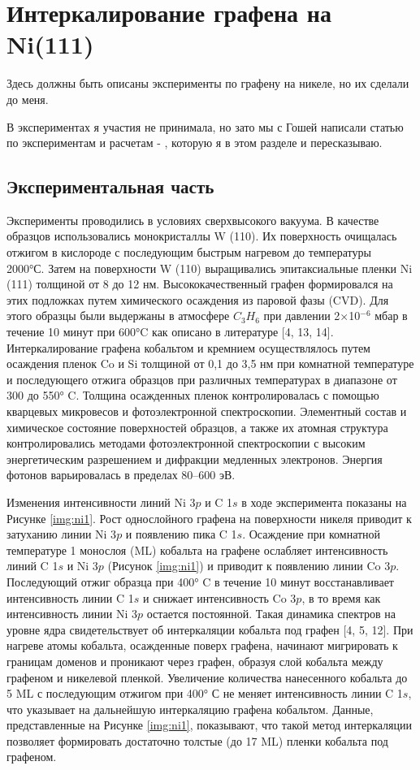 
\chapter{Интеркалирование графена на Ni(111)}\label{ch:ch1}
Здесь должны быть описаны эксперименты по графену на никеле, но их сделали до меня.

В экспериментах я участия не принимала, но зато мы с Гошей написали статью по экспериментам и расчетам - \cite{grebenyuk2019840}, которую я в этом разделе и пересказываю.
\section{Экспериментальная часть}\label{sec:ch1/sec1}


Эксперименты проводились в условиях сверхвысокого вакуума. В качестве образцов использовались монокристаллы W (110). Их поверхность очищалась отжигом в кислороде с последующим быстрым нагревом до температуры ~ 2000°С. Затем на поверхности W (110)  выращивались эпитаксиальные пленки Ni (111) толщиной от 8 до 12 нм. Высококачественный графен формировался на этих подложках путем химического осаждения из паровой фазы (CVD). Для этого образцы были выдержаны в атмосфере $C_3H_6$ при давлении 2×10$^{-6}$ мбар в течение 10 минут при 600°C как описано в литературе [4, 13, 14]. Интеркалирование графена кобальтом и кремнием осуществлялось путем осаждения пленок Co и Si толщиной от 0,1 до 3,5 нм при комнатной температуре и последующего отжига образцов при различных температурах в диапазоне от 300 до 550° C. Толщина осажденных пленок контролировалась с помощью кварцевых микровесов и фотоэлектронной спектроскопии. 
Элементный состав и химическое состояние поверхностей образцов, а также их атомная структура контролировались методами фотоэлектронной спектроскопии с высоким энергетическим разрешением и дифракции медленных электронов. Энергия фотонов варьировалась в пределах 80–600 эВ.

Изменения интенсивности линий Ni 3$p$ и C 1$s$ в ходе эксперимента показаны на Рисунке \ref{img:ni1}. Рост однослойного графена на поверхности никеля приводит к затуханию линии Ni 3$p$ и появлению пика C 1$s$. Осаждение при комнатной температуре 1 монослоя (ML) кобальта на графене ослабляет интенсивность линий C 1$s$ и Ni 3$p$ (Рисунок \ref{img:ni1}) и приводит к появлению линии Co 3$p$. Последующий отжиг образца при 400° C в течение 10 минут восстанавливает интенсивность линии C 1$s$ и снижает интенсивность Co 3$p$, в то время как интенсивность линии Ni 3$p$ остается постоянной. Такая динамика спектров на уровне ядра свидетельствует об интеркаляции кобальта под графен [4, 5, 12]. При нагреве атомы кобальта, осажденные поверх графена, начинают мигрировать к границам доменов и проникают через графен, образуя слой кобальта между графеном и никелевой пленкой.
Увеличение количества нанесенного кобальта до 5 ML с последующим отжигом при 400° С не меняет интенсивность линии C 1$s$, что указывает на дальнейшую интеркаляцию графена кобальтом. Данные, представленные на Рисунке \ref{img:ni1}, показывают, что такой метод интеркаляции позволяет формировать достаточно толстые (до 17 ML) пленки кобальта под графеном.

